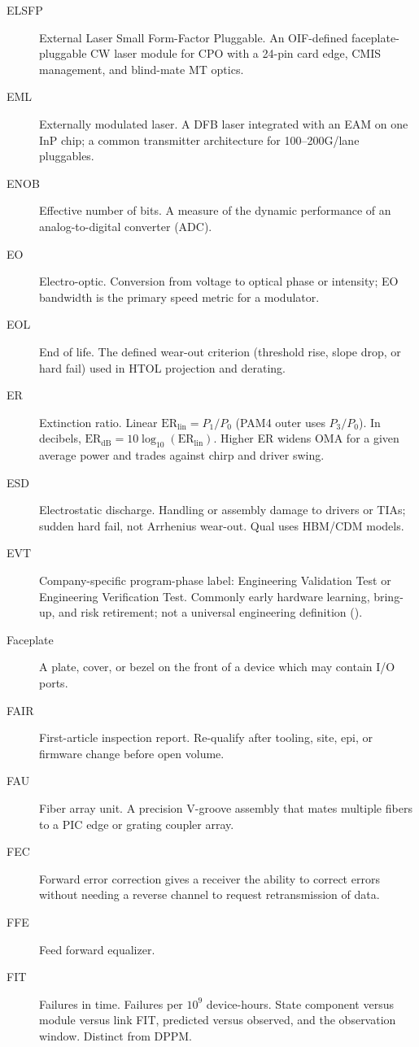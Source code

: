 \begin{description}
\item[ELSFP] External Laser Small Form-Factor Pluggable. An OIF-defined faceplate-pluggable CW laser module for CPO with a 24-pin card edge, CMIS management, and blind-mate MT optics.
\item[EML] Externally modulated laser. A DFB laser integrated with an EAM on one InP chip; a common transmitter architecture for 100--200G/lane pluggables.
\item[ENOB] Effective number of bits. A measure of the dynamic performance of an analog-to-digital converter (ADC).
\item[EO] Electro-optic. Conversion from voltage to optical phase or intensity; EO bandwidth is the primary speed metric for a modulator.
\item[EOL] End of life. The defined wear-out criterion (threshold rise, slope drop, or hard fail) used in HTOL projection and derating.
\item[ER] Extinction ratio. Linear $\mathrm{ER}_\mathrm{lin}=P_1/P_0$ (PAM4 outer uses $P_3/P_0$). In decibels, $\mathrm{ER}_\mathrm{dB}=10\log_{10}(\mathrm{ER}_\mathrm{lin})$. Higher ER widens OMA for a given average power and trades against chirp and driver swing.
\item[ESD] Electrostatic discharge. Handling or assembly damage to drivers or TIAs; sudden hard fail, not Arrhenius wear-out. Qual uses HBM/CDM models.
\item[EVT] Company-specific program-phase label: Engineering Validation Test or Engineering Verification Test. Commonly early hardware learning, bring-up, and risk retirement; not a universal engineering definition ().
\item[Faceplate] A plate, cover, or bezel on the front of a device which may contain I/O ports.
\item[FAIR] First-article inspection report. Re-qualify after tooling, site, epi, or firmware change before open volume.
\item[FAU] Fiber array unit. A precision V-groove assembly that mates multiple fibers to a PIC edge or grating coupler array.
\item[FEC] Forward error correction gives a receiver the ability to correct errors without needing a reverse channel to request retransmission of data.
\item[FFE] Feed forward equalizer.
\item[FIT] Failures in time. Failures per $10^9$ device-hours. State component versus module versus link FIT, predicted versus observed, and the observation window. Distinct from DPPM.

\end{description}
